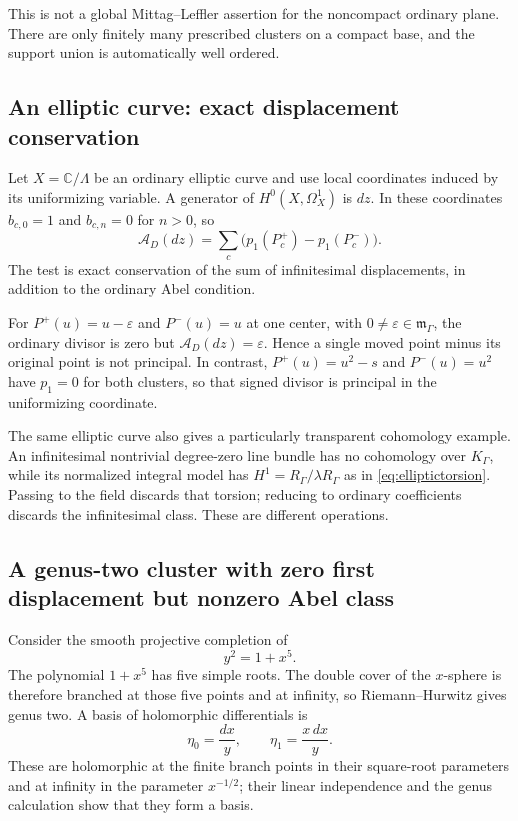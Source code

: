 \documentclass[11pt,letterpaper]{article}
\numberwithin{equation}{section}
\theoremstyle{definition}
\theoremstyle{remark}
\newcommand{\C}{\mathbb C}
\newcommand{\mm}{\mathfrak m}
\newcommand{\Kg}{K_\Gamma}
\newcommand{\rg}{R_\Gamma}
\newcommand{\mg}{\mm_\Gamma}
\newcommand{\eps}{\varepsilon}
\begin{document}
This is not a global Mittag--Leffler assertion for the noncompact
ordinary plane. There are only finitely many prescribed clusters on a
compact base, and the support union is automatically well ordered.

\subsection{An elliptic curve: exact displacement conservation}
Let $X=\C/\Lambda$ be an ordinary elliptic curve and use local
coordinates induced by its uniformizing variable. A generator of
$H^0(X,\Omega_X^1)$ is $dz$. In these coordinates
$b_{c,0}=1$ and $b_{c,n}=0$ for $n>0$, so
\begin{equation}
 \mathcal A_D(dz)=\sum_c\bigl(p_1(P_c^+)-p_1(P_c^-)\bigr).
 \label{eq:ellipticAbel}
\end{equation}
The test is exact conservation of the sum of infinitesimal
displacements, in addition to the ordinary Abel condition.

For $P^+(u)=u-\eps$ and $P^-(u)=u$ at one center, with
$0\ne\eps\in\mg$, the ordinary divisor is zero but
$\mathcal A_D(dz)=\eps$. Hence a single moved point minus its original
point is not principal. In contrast,
$P^+(u)=u^2-s$ and $P^-(u)=u^2$ have $p_1=0$ for both clusters,
so that signed divisor is principal in the uniformizing coordinate.

The same elliptic curve also gives a particularly transparent
cohomology example. An infinitesimal nontrivial degree-zero line bundle
has no cohomology over $\Kg$, while its normalized integral model has
$H^1=\rg/\lambda\rg$ as in \eqref{eq:elliptictorsion}. Passing to the
field discards that torsion; reducing to ordinary coefficients discards
the infinitesimal class. These are different operations.

\subsection{A genus-two cluster with zero first displacement but nonzero Abel class}
Consider the smooth projective completion of
\begin{equation}
 y^2=1+x^5.
 \label{eq:hyperelliptic}
\end{equation}
The polynomial $1+x^5$ has five simple roots. The double cover of the
$x$-sphere is therefore branched at those five points and at infinity,
so Riemann--Hurwitz gives genus two. A basis of holomorphic
differentials is
\begin{equation}
 \eta_0=\frac{dx}{y},\qquad\eta_1=\frac{x\,dx}{y}.
 \label{eq:genus2forms}
\end{equation}
These are holomorphic at the finite branch points in their square-root
parameters and at infinity in the parameter $x^{-1/2}$; their linear
independence and the genus calculation show that they form a basis.
\end{document}
